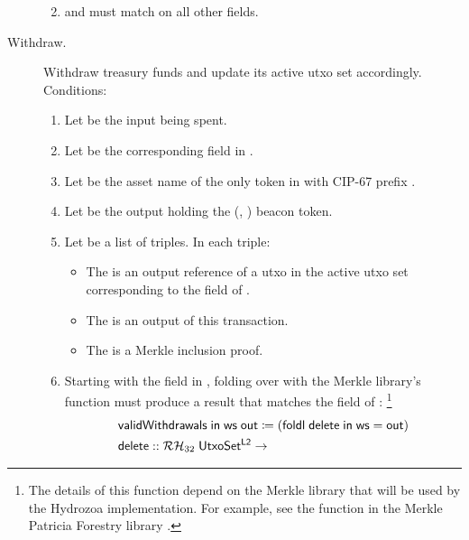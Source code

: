\documentclass[../hydrozoa.tex]{subfiles}
\begin{document}
\begin{description}
\begin{enumerate}
\begin{enumerate}
        \end{enumerate}
      \item {} and  must match on all other fields.
    \end{enumerate}
  \item[Withdraw.] Withdraw treasury funds and update its active utxo set accordingly.
    Conditions:
    \begin{enumerate}
      \item Let  be the input being spent.
      \item Let  be the corresponding field in .
      \item Let  be the asset name of the only  token in  with CIP-67 prefix .
      \item Let  be the output holding the (, ) beacon token.
      \item Let  be a list of triples. In each triple:
        \begin{itemize}
          \item The  is an output reference of a utxo in the active utxo set corresponding to the  field of .
          \item The  is an output of this transaction.
          \item The  is a Merkle inclusion proof.
        \end{itemize}
      \item Starting with the  field in , folding over  with the Merkle library's  function must produce a result that matches the  field of :%
        \footnote{The details of this function depend on the Merkle library that will be used by the Hydrozoa implementation. For example, see the  function in the Merkle Patricia Forestry library \citep{MatthiasBenkortMerklePatriciaForestry2024}.}
        \begin{equation*}
        \begin{split}
          &\T{validWithdrawals} \; \T{in} \; \T{ws} \; \T{out} \coloneq
            (\T{foldl} \; \T{delete} \; \T{in} \; \T{ws} = \T{out}) \\
          &\T{delete} ::
            \mathcal{RH}_{32} \; \T{UtxoSet^{L2}} ->

\end{split}
\end{equation*}
\end{enumerate}
\end{description}
\end{document}
